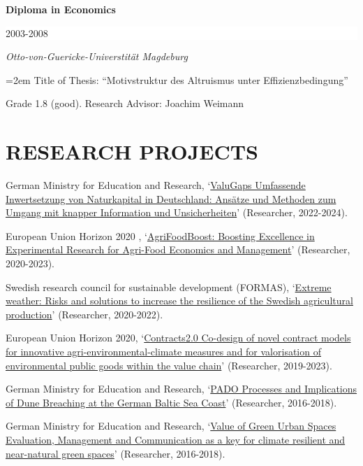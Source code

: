 \documentclass[paper=a4,fontsize=11pt]{scrartcl} %
\newcommand{\NewPart}[2]{\section*{\uppercase{#1} #2}}
\newcommand{\EducationEntry}[4]{
		\noindent \textbf{#1} \hfill      %
		\colorbox{White}{%
			\parbox{6em}{%
			\hfill\color{Black}#2}} \par  %
		\noindent \textit{#3} \par        %
		\noindent\hangindent=2em\hangafter=0 \small #4 %
		\normalsize \par}
\newcommand{\FundingEntry}[4]{
        \noindent #1, `#2' (#3, #4).}
\begin{document}
\EducationEntry{Diploma in Economics}{2003-2008}{Otto-von-Guericke-Universtität Magdeburg}{Title of Thesis: ``Motivstruktur des Altruismus unter Effizienzbedingung''}{Grade 1.8 (good). Research Advisor: Joachim Weimann}





\NewPart{Research Projects}{}

\begin{etaremune}

\item\FundingEntry {German Ministry for Education and Research}{\href{https://www.feda.bio/de/valugaps/}{ValuGaps Umfassende Inwertsetzung von Naturkapital in Deutschland: Ansätze und Methoden zum Umgang mit knapper Information und Unsicherheiten}}{Researcher}{2022-2024}

\item\FundingEntry {European Union Horizon 2020 }{\href{}{AgriFoodBoost: Boosting Excellence in Experimental Research for Agri-Food Economics and Management}}{Researcher}{2020-2023}

\item\FundingEntry {Swedish research council for sustainable development (FORMAS)}{\href{https://www.slu.se/en/departments/soil-environment/research/agricultural-water-management-/extreme-weather-and-resilience-in-swedish-agriculture/}{Extreme weather: Risks and solutions to increase the resilience of the Swedish agricultural production}}{Researcher}{2020-2022}

\item\FundingEntry {European Union Horizon 2020}{\href{www.project-contracts20.eu}{Contracts2.0 Co-design of novel contract models for innovative agri-environmental-climate measures and for
valorisation of environmental public goods within the value chain}}{Researcher}{2019-2023}

\item\FundingEntry {German Ministry for Education and Research}{\href{https://www.ioew.de/en/project-single/pado_processes_and_implications_of_dune_breaching_at_the_german_baltic_sea_coast/}{PADO Processes and Implications of Dune Breaching at the German Baltic Sea Coast}}{Researcher}{2016-2018}

\item\FundingEntry {German Ministry for Education and Research}{\href{https://www.ioew.de/en/project-single/value_of_green_urban_spaces/}{Value of Green Urban Spaces Evaluation, Management and Communication as a key for climate resilient and near-natural green spaces}}{Researcher}{2016-2018}



\end{etaremune}
\end{document}
